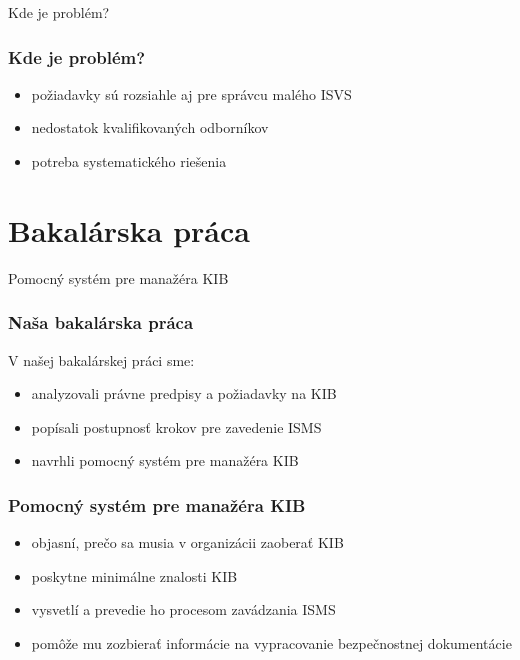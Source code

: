 \documentclass{beamer}
\begin{document}
\begin{frame}
  \begin{center}
    \Huge Kde je problém?
  \end{center}
\end{frame}
\begin{frame}
  \frametitle{Kde je problém?}
  \begin{itemize}
    \item požiadavky sú rozsiahle aj pre správcu malého ISVS
    \item nedostatok kvalifikovaných odborníkov
    \item potreba systematického riešenia
  \end{itemize}
\end{frame}

\section{Bakalárska práca}
\begin{frame}
  \begin{center}
    \Huge Pomocný systém pre manažéra KIB
  \end{center}
\end{frame}

\begin{frame}
  \frametitle{Naša bakalárska práca}

  V našej bakalárskej práci sme:
  \begin{itemize}
    \item analyzovali právne predpisy a požiadavky na KIB
    \item popísali postupnosť krokov pre zavedenie ISMS
    \item navrhli pomocný systém pre manažéra KIB
  \end{itemize}
\end{frame}

\begin{frame}
  \frametitle{Pomocný systém pre manažéra KIB}

  \begin{itemize}
    \item objasní, prečo sa musia v organizácii zaoberať KIB
    \item poskytne minimálne znalosti KIB
    \item vysvetlí a prevedie ho procesom zavádzania ISMS
    \item pomôže mu zozbierať informácie na vypracovanie bezpečnostnej dokumentácie
  \end{itemize}
\end{frame}
\end{document}
